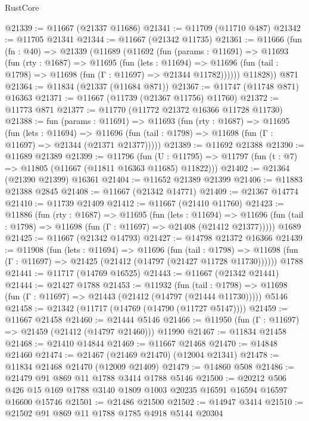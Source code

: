 \begin{lexlean}{RustCore}
\begin{coremodule}
@21339 := @11667 (@21337 @11686)
@21341 := @11709 (@11710 @487)
@21342 := @11705 @21341
@21344 := @11667 (@21342 @11735)
@21361 := @11666
    (fun (fn : @40) =>
    @21339
      (@11689
        (@11692
          (fun (params : @11691) =>
          @11693
            (fun (rty : @1687) =>
            @11695
              (fun (lets : @11694) =>
              @11696 (fun (tail : @1798) => @11698 (fun (Γ : @11697) => @21344 @11782))))))
        @11828))
    @871
@21364 := @11834 (@21337 (@11684 @871))
@21367 := @11747 (@11748 @871) @16363
@21371 := @11667 (@11739 (@21367 @11756) @11760)
@21372 := @11773 @871
@21377 := @11770 (@11772 @21372 @16366 @11728 @11730)
@21388 := fun (params : @11691) =>
  @11693
    (fun (rty : @1687) =>
    @11695
      (fun (lets : @11694) =>
      @11696 (fun (tail : @1798) => @11698 (fun (Γ : @11697) => @21344 (@21371 @21377)))))
@21389 := @11692 @21388
@21390 := @11689 @21389
@21399 := @11796
    (fun (U : @11795) => @11797 (fun (t : @7) => @11805 (@11667 (@11811 @16363 @11685) @11822)))
@21402 := @21364 (@21390 @21399) @16361
@21404 := @11652 @21389 @21399
@21406 := @11883 @21388 @2845
@21408 := @11667 (@21342 @14771)
@21409 := @21367 @14774
@21410 := @11739 @21409
@21412 := @11667 (@21410 @11760)
@21423 := @11886
    (fun (rty : @1687) =>
    @11695
      (fun (lets : @11694) =>
      @11696 (fun (tail : @1798) => @11698 (fun (Γ : @11697) => @21408 (@21412 @21377)))))
    @1689
@21425 := @11667 (@21342 @14793)
@21427 := @14798 @21372 @16366
@21439 := @11908
    (fun (lets : @11694) =>
    @11696
      (fun (tail : @1798) =>
      @11698 (fun (Γ : @11697) => @21425 (@21412 (@14797 (@21427 @11728 @11730))))))
    @1788
@21441 := @11717 (@14769 @16525)
@21443 := @11667 (@21342 @21441)
@21444 := @21427 @1788
@21453 := @11932
    (fun (tail : @1798) => @11698 (fun (Γ : @11697) => @21443 (@21412 (@14797 (@21444 @11730)))))
    @5146
@21458 := @21342 (@11717 (@14769 (@14790 (@11727 @5147))))
@21459 := @11667 @21458
@21460 := @21444 @5146
@21466 := @11950 (fun (Γ : @11697) => @21459 (@21412 (@14797 @21460))) @11990
@21467 := @11834 @21458
@21468 := @21410 @14844
@21469 := @11667 @21468
@21470 := @14848 @21460
@21474 := @21467 (@21469 @21470) (@12004 @21341)
@21478 := @11834 @21468 @21470 (@12009 @21409)
@21479 := @14860 @508
@21486 := @21479 @91 @869 @11 @1788 @3414 @1788 @5146
@21500 := @20212
    @506
    @426
    @15
    @169
    @1788
    @3140
    @1809
    @1003
    @20235
    @16591
    @16594
    @16597
    @16600
    @15746
@21501 := @21486 @21500
@21502 := @14947 @3414
@21510 := @21502 @91 @869 @11 @1788 @1785 @4918 @5144 @20304

\end{coremodule}
\end{lexlean}
